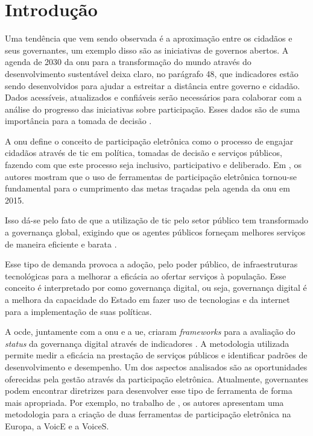 \chapter[Introdução]{Introdução}
\label{cap:cap1}
Uma tendência que vem sendo observada é a aproximação entre os cidadãos e seus governantes, um exemplo disso são as iniciativas de governos abertos.
A agenda de 2030 da \acrfull{onu} para a transformação do mundo através do desenvolvimento sustentável deixa claro, no parágrafo 48, que
indicadores estão sendo desenvolvidos para ajudar a estreitar a distância entre governo e cidadão. Dados acessíveis, atualizados e confiáveis serão necessários para colaborar 
com a análise do progresso das iniciativas sobre participação. 
Esses dados são de suma importância para a tomada de decisão \cite{assembly2015transforming}.

\par
A \acrshort{onu} define o conceito de participação eletrônica como o processo de engajar cidadãos através de \acrfull{tic} em política, tomadas de decisão e
serviços públicos, fazendo com que este processo seja inclusivo, participativo e deliberado. Em , os autores mostram que o uso de 
ferramentas de participação eletrônica tornou-se fundamental para o cumprimento das metas traçadas pela agenda da \acrshort{onu} em 2015. 

\par
Isso dá-se pelo fato de que a utilização de \acrshort{tic} pelo setor público tem transformado a governança global, exigindo que os agentes públicos forneçam melhores serviços 
de maneira eficiente e barata \cite{afdb2014uneca}. 

\par
Esse tipo de demanda provoca a adoção, pelo poder público, de infraestruturas tecnológicas para a melhorar a eficácia ao ofertar serviços à população. Esse conceito é interpretado
por  como governança digital, ou seja, governança digital é a melhora da capacidade do Estado em fazer uso de tecnologias e da internet 
para a implementação de suas políticas.

\par
A \acrfull{ocde}, juntamente com a \acrshort{onu} e a \acrfull{ue}, criaram \textit{frameworks} para a avaliação do \textit{status} da governança digital através de indicadores \cite{onu2018}. A metodologia utilizada permite medir a eficácia na prestação de serviços públicos e identificar padrões de desenvolvimento e desempenho. Um dos aspectos analisados são as oportunidades oferecidas pela gestão através da participação eletrônica. 
Atualmente, governantes podem encontrar diretrizes para desenvolver esse tipo de ferramenta de forma mais apropriada.
Por exemplo,  no trabalho de , os autores apresentam uma metodologia para a criação de duas ferramentas de participação eletrônica na Europa, a VoicE e a VoiceS.

